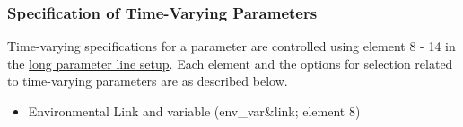 \subsubsection{Specification of Time-Varying Parameters} 


Time-varying specifications for a parameter are controlled using element 8 - 14 in the \hyperlink{paraOrder}{long parameter line setup}. Each element and the options for selection related to time-varying parameters are as described below.

\hypertarget{EnvVar}{}
\begin{itemize}

\item Environmental Link and variable (env\_var\&link; element 8)


\end{itemize}
